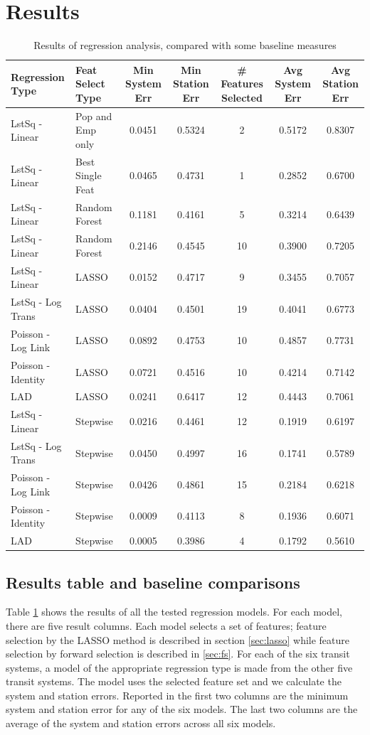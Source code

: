 \documentclass[11pt]{article}
\begin{document}

\section{Results}

\begin{table}[H]
\begingroup\fontsize{8}{15}\selectfont
\centering
\begin{tabular}{ll|ccccc}
\toprule
Regression Type&Feat Select Type& Min System Err&Min Station Err& \# Features Selected& Avg System Err& Avg Station Err\\
\midrule
LstSq - Linear&Pop and Emp only&0.0451&0.5324&2&0.5172&0.8307\\
LstSq - Linear&Best Single Feat&0.0465&0.4731&1&0.2852&0.6700\\
LstSq - Linear&Random Forest&0.1181&0.4161&5&0.3214&0.6439\\
LstSq - Linear&Random Forest&0.2146&0.4545&10&0.3900&0.7205\\
\midrule
LstSq - Linear&LASSO&0.0152&0.4717&9&0.3455&0.7057\\
LstSq - Log Trans&LASSO&0.0404&0.4501&19&0.4041&0.6773\\
Poisson - Log Link&LASSO&0.0892&0.4753&10&0.4857&0.7731\\
Poisson - Identity&LASSO&0.0721&0.4516&10&0.4214&0.7142\\
LAD&LASSO&0.0241&0.6417&12&0.4443&0.7061\\
\midrule
LstSq - Linear&Stepwise&0.0216&0.4461&12&0.1919&0.6197\\
LstSq - Log Trans&Stepwise&0.0450&0.4997&16&0.1741&0.5789\\
Poisson - Log Link&Stepwise&0.0426&0.4861&15&0.2184&0.6218\\
Poisson - Identity&Stepwise&0.0009&0.4113&8&0.1936&0.6071\\
LAD&Stepwise&0.0005&0.3986&4&0.1792&0.5610\\
\end{tabular}
\caption{Results of regression analysis, compared with some baseline measures}\label{tab:rresults}
\endgroup
\end{table}

\subsection{Results table and baseline comparisons}

Table \ref{tab:rresults} shows the results of all the tested regression models. For each model, there are five result columns. Each model selects a set of features; feature selection by the LASSO method is described in section \ref{sec:lasso} while feature selection by forward selection is described in \ref{sec:fs}. For each of the six transit systems, a model of the appropriate regression type is made from the other five transit systems. The model uses the selected feature set and we calculate the system and station errors. Reported in the first two columns are the minimum system and station error for any of the six models. The last two columns are the average of the system and station errors across all six models. 
\end{document}
